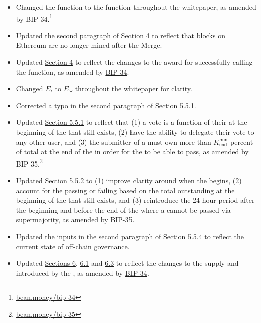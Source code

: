 \documentclass[class=article, crop=false]{standalone}
\begin{document}
\begin{itemize}[topsep=0pt, itemsep=3pt,leftmargin=16pt]
    \begin{itemize}
        \item Changed the  function to the  function throughout the whitepaper, as amended by \href{https://bean.money/bip-34}{BIP-34}.\footnote{\href{https://bean.money/bip-34}{bean.money/bip-34}}
        \item Updated the second paragraph of \hyperlink{section.4}{Section 4} to reflect that blocks on Ethereum are no longer mined after the Merge.
        \item Updated \hyperlink{section.4}{Section 4} to reflect the changes to the award for successfully calling the  function, as amended by \href{https://bean.money/bip-34}{BIP-34}.
        \item Changed $E_t$ to $E_\Xi$ throughout the whitepaper for clarity.
        \item Corrected a typo in the second paragraph of \hyperlink{subsubsection.5.5.1}{Section 5.5.1}.
        \item Updated \hyperlink{subsubsection.5.5.1}{Section 5.5.1} to reflect that (1) a  vote is a function of their  at the beginning of the  that still exists, (2)  have the ability to delegate their vote to any other user, and (3) the submitter of a  must own more than $K_{\text{end}}^{\text{min}}$ percent of total  at the end of the  in  order for the  to be able to pass, as amended by \href{https://bean.money/bip-35}{BIP-35}.\footnote{\href{https://bean.money/bip-35}{bean.money/bip-35}}
        \item Updated \hyperlink{subsubsection.5.5.2}{Section 5.5.2} to (1) improve clarity around when the  begins, (2) account for the  passing or failing based on the total outstanding  at the beginning of the  that still exists, and (3) reintroduce the 24 hour period after the beginning and before the end of the  where a  cannot be passed via supermajority, as amended by \href{https://bean.money/bip-35}{BIP-35}.
        \item Updated the  inputs in the second paragraph of \hyperlink{subsubsection.5.5.4}{Section 5.5.4} to reflect the current state of off-chain governance.
        \item Updated \hyperlink{section.6}{Sections 6}, \hyperlink{subsection.6.1}{6.1} and \hyperlink{subsection.6.3}{6.3} to reflect the changes to the  supply and  introduced by the , as amended by \href{https://bean.money/bip-34}{BIP-34}.

\end{itemize}
\end{itemize}
\end{document}
